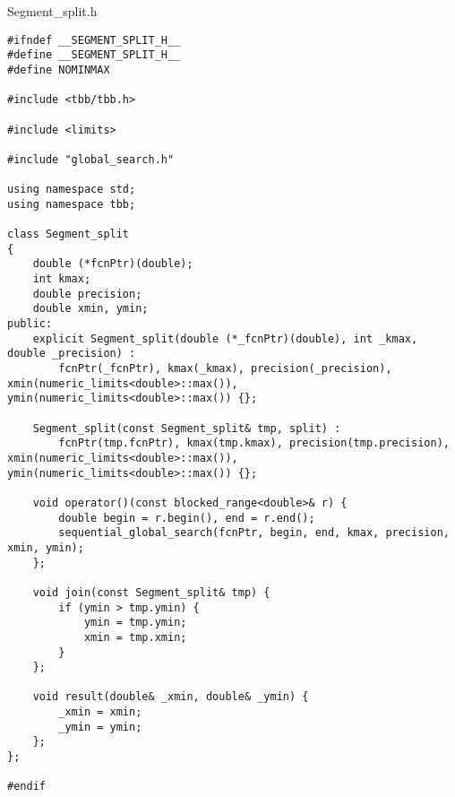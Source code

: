 \documentclass{report}
\begin{document}
Segment\_split.h
\begin{lstlisting}
#ifndef __SEGMENT_SPLIT_H__
#define __SEGMENT_SPLIT_H__
#define NOMINMAX

#include <tbb/tbb.h>

#include <limits>

#include "global_search.h"

using namespace std;
using namespace tbb;

class Segment_split
{
    double (*fcnPtr)(double);
    int kmax;
    double precision;
    double xmin, ymin;
public:
    explicit Segment_split(double (*_fcnPtr)(double), int _kmax, double _precision) :
        fcnPtr(_fcnPtr), kmax(_kmax), precision(_precision), xmin(numeric_limits<double>::max()), ymin(numeric_limits<double>::max()) {};

    Segment_split(const Segment_split& tmp, split) :
        fcnPtr(tmp.fcnPtr), kmax(tmp.kmax), precision(tmp.precision), xmin(numeric_limits<double>::max()), ymin(numeric_limits<double>::max()) {};

    void operator()(const blocked_range<double>& r) {
        double begin = r.begin(), end = r.end();
        sequential_global_search(fcnPtr, begin, end, kmax, precision, xmin, ymin);
    };

    void join(const Segment_split& tmp) {
        if (ymin > tmp.ymin) {
            ymin = tmp.ymin;
            xmin = tmp.xmin;
        }
    };

    void result(double& _xmin, double& _ymin) {
        _xmin = xmin;
        _ymin = ymin;
    };
};

#endif
\end{lstlisting}
\end{document}
